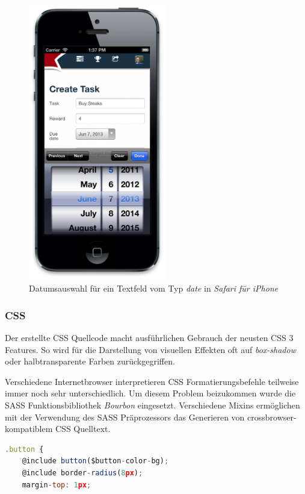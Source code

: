 \begin{figure}[H]
	\centering
	\includegraphics[width=6cm]{content/principle-demonstration/images/iossafari-datepicker.png}
	\caption{Datumsauswahl für ein Textfeld vom Typ \emph{date} in \emph{Safari für iPhone}}
	\label{fig:iossafari-datepicker}
\end{figure}


\subsubsection*{CSS}

Der erstellte CSS Quellcode macht ausführlichen Gebrauch der neusten CSS 3 Features. So wird für die Darstellung von visuellen Effekten oft auf \emph{box-shadow} oder halbtransparente Farben zurückgegriffen.

Verschiedene Internetbrowser interpretieren CSS Formatierungsbefehle teilweise immer noch sehr unterschiedlich. Um diesem Problem beizukommen wurde die SASS Funktionsbibliothek \emph{Bourbon} \cite{bourbon} eingesetzt. Verschiedene Mixins ermöglichen mit der Verwendung des SASS Präprozessors \cite{SASS} das Generieren von crossbrowser-kompatiblem CSS Quelltext.

\begin{lstlisting}[language=JavaScript, firstnumber=4, caption={Einbindung des \emph{@border-radius} Mixins von \emph{Bourbon} \cite{RoomiesSassBorderRadiusMixin}}, label={lst:roomiesSassBorderRadiusMixin}]
.button {
	@include button($button-color-bg);
	@include border-radius(8px);
	margin-top: 1px;
\end{lstlisting}


